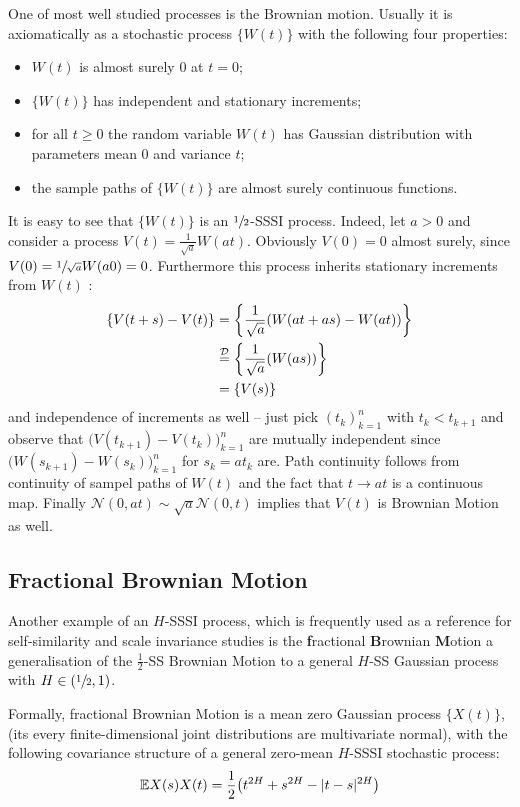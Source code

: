 One of most well studied processes is the Brownian motion. Usually it is axiomatically
as a stochastic process $\bigl\{W(t)\bigr\}$ with the following four properties: \begin{itemize}
	\item $W(t)$ is almost surely $0$ at $t=0$;
	\item $\{W(t)\}$ has independent and stationary increments;
	\item for all $t\geq 0$ the random variable $W(t)$ has Gaussian distribution with
	parameters mean $0$ and variance $t$;
	\item the sample paths of $\{W(t)\}$ are almost surely continuous functions.
\end{itemize}

It is easy to see that $\{W(t)\}$ is an $\sfrac{1}{2}$-SSSI process. Indeed, let $a>0$
and consider a process $V(t) = \frac{1}{\sqrt{a}} W(at)$. Obviously $V(0) = 0$ almost
surely, since $V(0) = \sfrac{1}{\sqrt{a}} W(a 0) = 0$. Furthermore this process inherits
stationary increments from $W(t)$ : \begin{align*}
	\{ V(t+s) - V(t) \} &= \biggl\{ \frac{1}{\sqrt{a}}( W(at+as) - W(at) ) \biggr\}\\
	&\overset{\mathcal{D}}{=} \biggl\{ \frac{1}{\sqrt{a}}( W(as) ) \biggr\} \\
	&= \{ V(s) \}
\end{align*}
and independence of increments as well -- just pick $(t_k)_{k=1}^n$ with $t_k<t_{k+1}$ and
observe that $\bigl(V(t_{k+1}) - V(t_k)\bigr)_{k=1}^n$ are mutually independent since
$\bigl(W(s_{k+1}) - W(s_k)\bigr)_{k=1}^n$ for $s_k = a t_k$ are. Path continuity follows
from continuity of sampel paths of $W(t)$ and the fact that $t\to a t$ is a continuous map. 
Finally $\mathcal{N}(0, at) \sim \sqrt{a} \mathcal{N}(0,t)$ implies that $V(t)$ is Brownian
Motion as well.

\subsection{Fractional Brownian Motion} %
\label{sub:fractional_brownian_motion}

Another example of an $H$-SSSI process, which is frequently used as a reference for
self-similarity and scale invariance studies is the \textbf{f}ractional \textbf{B}rownian
\textbf{M}otion a generalisation of the $\tfrac{1}{2}$-SS Brownian Motion to a general
$H$-SS Gaussian process with $H\in (\sfrac{1}{2}, 1)$.

Formally, fractional Brownian Motion is a mean zero Gaussian process $\bigl\{X(t)\bigr\}$,
(its every finite-dimensional joint distributions are multivariate normal), with
the following covariance structure of a general zero-mean $H$-SSSI stochastic process:
\[ \mathbb{E} X(s) X(t) = \frac{1}{2} \bigl(t^{2H} + s^{2H} - |t-s|^{2H}\bigr) \]



